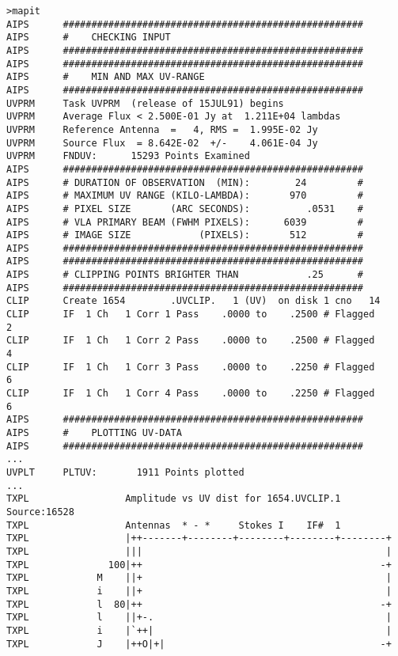 \begin{verbatim}
>mapit
AIPS      #####################################################
AIPS      #    CHECKING INPUT
AIPS      #####################################################
AIPS      #####################################################
AIPS      #    MIN AND MAX UV-RANGE
AIPS      #####################################################
UVPRM     Task UVPRM  (release of 15JUL91) begins
UVPRM     Average Flux < 2.500E-01 Jy at  1.211E+04 lambdas
UVPRM     Reference Antenna  =   4, RMS =  1.995E-02 Jy
UVPRM     Source Flux  = 8.642E-02  +/-    4.061E-04 Jy
UVPRM     FNDUV:      15293 Points Examined
AIPS      #####################################################
AIPS      # DURATION OF OBSERVATION  (MIN):        24         #
AIPS      # MAXIMUM UV RANGE (KILO-LAMBDA):       970         #
AIPS      # PIXEL SIZE       (ARC SECONDS):          .0531    #
AIPS      # VLA PRIMARY BEAM (FWHM PIXELS):      6039         #
AIPS      # IMAGE SIZE            (PIXELS):       512         #
AIPS      #####################################################
AIPS      #####################################################
AIPS      # CLIPPING POINTS BRIGHTER THAN            .25      #
AIPS      #####################################################
CLIP      Create 1654        .UVCLIP.   1 (UV)  on disk 1 cno   14
CLIP      IF  1 Ch   1 Corr 1 Pass    .0000 to    .2500 # Flagged        2
CLIP      IF  1 Ch   1 Corr 2 Pass    .0000 to    .2500 # Flagged        4
CLIP      IF  1 Ch   1 Corr 3 Pass    .0000 to    .2250 # Flagged        6
CLIP      IF  1 Ch   1 Corr 4 Pass    .0000 to    .2250 # Flagged        6
AIPS      #####################################################
AIPS      #    PLOTTING UV-DATA
AIPS      #####################################################
...
UVPLT     PLTUV:       1911 Points plotted
...
TXPL                 Amplitude vs UV dist for 1654.UVCLIP.1   Source:16528
TXPL                 Antennas  * - *     Stokes I    IF#  1
TXPL                 |++-------+--------+--------+--------+--------+
TXPL                 |||                                           |
TXPL              100|++                                          -+
TXPL            M    ||+                                           |
TXPL            i    ||+                                           |
TXPL            l  80|++                                          -+
TXPL            l    ||+-.                                         |
TXPL            i    |`++|                                         |
TXPL            J    |++O|+|                                      -+

\end{verbatim}
